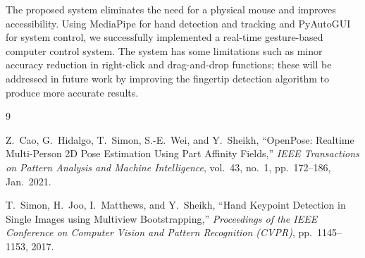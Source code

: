 \documentclass[12pt,a4paper]{report}
\begin{document}
The proposed system eliminates the need for a physical mouse and improves accessibility.
Using MediaPipe for hand detection and tracking and PyAutoGUI for system control, we
successfully implemented a real-time gesture-based computer control system. The system has
some limitations such as minor accuracy reduction in right-click and drag-and-drop functions;
these will be addressed in future work by improving the fingertip detection algorithm to
produce more accurate results.

\begin{thebibliography}{9}

Z.~Cao, G.~Hidalgo, T.~Simon, S.-E.~Wei, and Y.~Sheikh,
``OpenPose: Realtime Multi-Person 2D Pose Estimation Using Part Affinity Fields,''
\textit{IEEE Transactions on Pattern Analysis and Machine Intelligence}, vol.\ 43, no.\ 1, pp.\ 172--186, Jan.\ 2021.

T.~Simon, H.~Joo, I.~Matthews, and Y.~Sheikh,
``Hand Keypoint Detection in Single Images using Multiview Bootstrapping,''
\textit{Proceedings of the IEEE Conference on Computer Vision and Pattern Recognition (CVPR)}, pp.\ 1145--1153, 2017.

\end{thebibliography}
\end{document}
